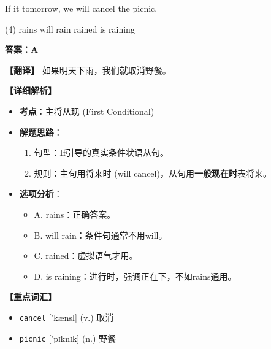 \documentclass[11pt, a4paper]{article}
\newcommand{\analysis}[4]{
    \begin{solutionbox}
        \textbf{答案：#1}
        
        \textbf{【翻译】} #2
        
        \textbf{【详细解析】}
        #3
        
        \textbf{【重点词汇】}
        #4
    \end{solutionbox}
}
\newcommand{\blank}{\underline{\hspace{1.5cm}}}
\begin{document}
\begin{questions}
    \item If it \blank tomorrow, we will cancel the picnic.
    \begin{tasks}(4)
        \task rains \task will rain \task rained \task is raining
    \end{tasks}
    \analysis{A}{如果明天下雨，我们就取消野餐。}{
        \begin{itemize}
            \item \textbf{考点}：主将从现 (First Conditional)
            \item \textbf{解题思路}：
                \begin{enumerate}
                    \item 句型：If引导的真实条件状语从句。
                    \item 规则：主句用将来时 (will cancel)，从句用\textbf{一般现在时}表将来。
                \end{enumerate}
            \item \textbf{选项分析}：
                \begin{itemize}
                    \item A. rains：正确答案。
                    \item B. will rain：条件句通常不用will。
                    \item C. rained：虚拟语气才用。
                    \item D. is raining：进行时，强调正在下，不如rains通用。
                \end{itemize}
        \end{itemize}
    }{
        \begin{itemize}
            \item \texttt{cancel} ['kænsl] (v.) 取消
            \item \texttt{picnic} ['pɪknɪk] (n.) 野餐
        \end{itemize}
    }


\end{questions}
\end{document}
